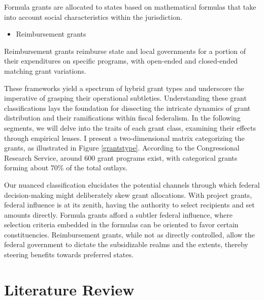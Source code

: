 Formula grants are allocated to states based on mathematical formulas that take into account social characteristics within the jurisdiction\parencite{huffman2006formula}.

\begin{itemize}
    \item{Reimbursement grants}
\end{itemize}

Reimbursement grants reimburse state and local governments for a portion of their expenditures on specific programs, with open-ended and closed-ended matching grant variations.

These frameworks yield a spectrum of hybrid grant types and underscore the imperative of grasping their operational subtleties. Understanding these grant classifications lays the foundation for dissecting the intricate dynamics of grant distribution and their ramifications within fiscal federalism. In the following segments, we will delve into the traits of each grant class, examining their effects through empirical lenses. I present a two-dimensional matrix categorizing the grants, as illustrated in Figure \ref{grantstype}. According to the Congressional Research Service, around 600 grant programs exist, with categorical grants forming about 70\% of the total outlays\parencite{dilger2015federal}.


Our nuanced classification elucidates the potential channels through which federal decision-making might deliberately skew grant allocations. With project grants, federal influence is at its zenith, having the authority to select recipients and set amounts directly. Formula grants afford a subtler federal influence, where selection criteria embedded in the formulas can be oriented to favor certain constituencies. Reimbursement grants, while not as directly controlled, allow the federal government to dictate the subsidizable realms and the extents, thereby steering benefits towards preferred states.


\section{Literature Review}

